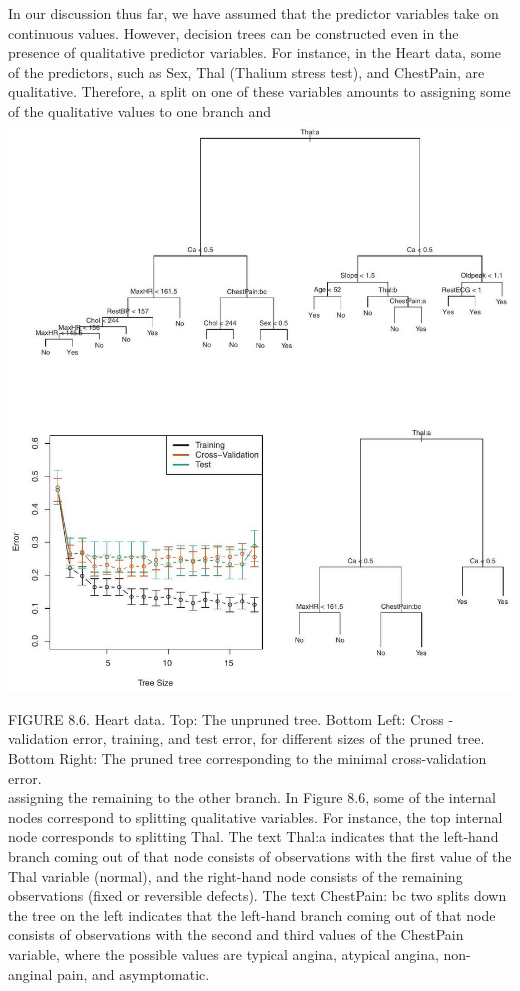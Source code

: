 \documentclass[10pt]{article}
\begin{document}
In our discussion thus far, we have assumed that the predictor variables take on continuous values. However, decision trees can be constructed even in the presence of qualitative predictor variables. For instance, in the Heart data, some of the predictors, such as Sex, Thal (Thalium stress test), and ChestPain, are qualitative. Therefore, a split on one of these variables amounts to assigning some of the qualitative values to one branch and\\
\includegraphics[max width=\textwidth, center]{2025_05_05_efe77898333945044de4g-328}

FIGURE 8.6. Heart data. Top: The unpruned tree. Bottom Left: Cross -validation error, training, and test error, for different sizes of the pruned tree. Bottom Right: The pruned tree corresponding to the minimal cross-validation error.\\
assigning the remaining to the other branch. In Figure 8.6, some of the internal nodes correspond to splitting qualitative variables. For instance, the top internal node corresponds to splitting Thal. The text Thal:a indicates that the left-hand branch coming out of that node consists of observations with the first value of the Thal variable (normal), and the right-hand node consists of the remaining observations (fixed or reversible defects). The text ChestPain: bc two splits down the tree on the left indicates that the left-hand branch coming out of that node consists of observations with the second and third values of the ChestPain variable, where the possible values are typical angina, atypical angina, non-anginal pain, and asymptomatic.
\end{document}
